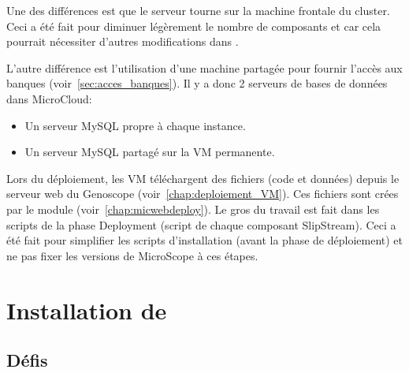 Une des différences est que le serveur  tourne
sur la machine frontale du cluster.
Ceci a été fait pour diminuer légèrement le nombre de composants
et car cela pourrait nécessiter d'autres modifications dans .

L'autre différence est l'utilisation d'une machine partagée pour fournir l'accès aux banques (voir~\autoref{sec:acces_banques}).
Il y a donc 2 serveurs de bases de données dans MicroCloud:
\begin{itemize}
    \item Un serveur MySQL propre à chaque instance.
    \item Un serveur MySQL partagé sur la VM permanente.
\end{itemize}\vspace*{\baselineskip}

Lors du déploiement, les VM téléchargent des fichiers (code et données) depuis le serveur web du Genoscope (voir~\autoref{chap:deploiement_VM}).
Ces fichiers sont crées par le module \micWEBdeployVer{} (voir~\autoref{chap:micwebdeploy}).
Le gros du travail est fait dans les scripts de la phase Deployment (script  de chaque composant SlipStream).
Ceci a été fait pour simplifier les scripts d'installation (avant la phase de déploiement)
et ne pas fixer les versions de MicroScope à ces étapes.

\section{Installation de } \label{sec:installation_jbpmmicroscope}

\subsection{Défis}

